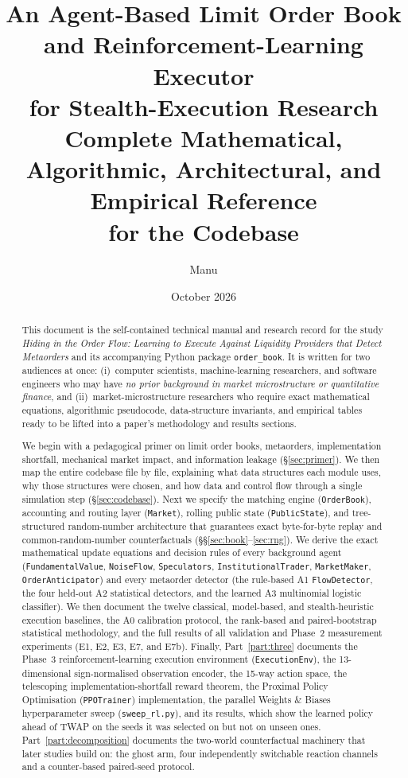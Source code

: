 \documentclass[11pt,a4paper]{article}
\title{\textbf{An Agent-Based Limit Order Book and Reinforcement-Learning Executor\\for Stealth-Execution Research}\\[6pt]
       \large Complete Mathematical, Algorithmic, Architectural, and Empirical Reference\\for the \code{order\_book} Codebase}
\author{Manu}
\date{October 2026}
\newcommand{\code}[1]{\texttt{#1}}
\begin{document}
\maketitle

\begin{abstract}
This document is the self-contained technical manual and research record for the study
\emph{Hiding in the Order Flow: Learning to Execute Against Liquidity Providers that Detect Metaorders}
and its accompanying Python package \code{order\_book}. It is written for two audiences at once:
(i)~computer scientists, machine-learning researchers, and software engineers who may have \emph{no
prior background in market microstructure or quantitative finance}, and (ii)~market-microstructure
researchers who require exact mathematical equations, algorithmic pseudocode, data-structure
invariants, and empirical tables ready to be lifted into a paper's methodology and results sections.

We begin with a pedagogical primer on limit order books, metaorders, implementation shortfall,
mechanical market impact, and information leakage (\S\ref{sec:primer}). We then map the entire
codebase file by file, explaining what data structures each module uses, why those structures were
chosen, and how data and control flow through a single simulation step (\S\ref{sec:codebase}). Next we
specify the matching engine (\code{OrderBook}), accounting and routing layer (\code{Market}), rolling
public state (\code{PublicState}), and tree-structured random-number architecture that guarantees
exact byte-for-byte replay and common-random-number counterfactuals (\S\S\ref{sec:book}--\ref{sec:rng}).
We derive the exact mathematical update equations and decision rules of every background agent
(\code{FundamentalValue}, \code{NoiseFlow}, \code{Speculators}, \code{InstitutionalTrader},
\code{MarketMaker}, \code{OrderAnticipator}) and every metaorder detector (the rule-based A1
\code{FlowDetector}, the four held-out A2 statistical detectors, and the learned A3 multinomial
logistic classifier). We then document the twelve classical, model-based, and stealth-heuristic
execution baselines, the A0 calibration protocol, the rank-based and paired-bootstrap statistical
methodology, and the full results of all validation and Phase~2 measurement experiments (E1, E2, E3,
E7, and E7b). Finally, Part~\ref{part:three} documents the Phase~3 reinforcement-learning execution
environment (\code{ExecutionEnv}), the 13-dimensional sign-normalised observation encoder, the 15-way
action space, the telescoping implementation-shortfall reward theorem, the Proximal Policy
Optimisation (\code{PPOTrainer}) implementation, the parallel Weights \& Biases hyperparameter sweep
(\code{sweep\_rl.py}), and its results, which show the learned policy ahead of TWAP on the seeds it was selected on but not on unseen ones. Part~\ref{part:decomposition} documents the two-world counterfactual machinery that later studies build on: the ghost arm, four independently switchable reaction channels and a counter-based paired-seed protocol.
\end{abstract}
\end{document}
